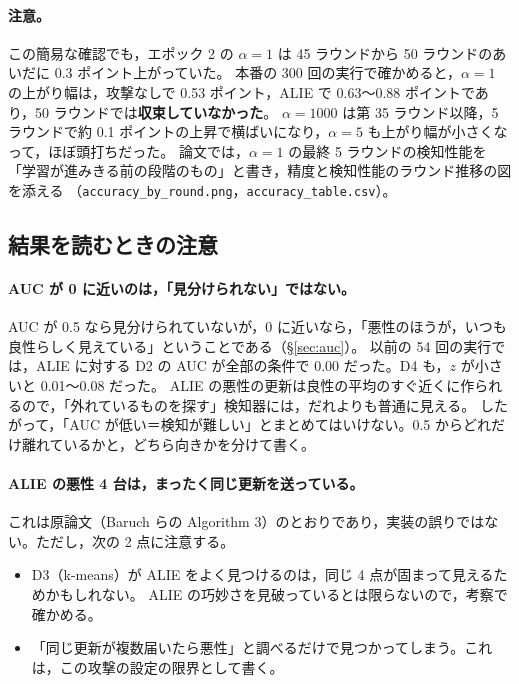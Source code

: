 \documentclass[a4j, dvipdfmx]{jsarticle}  %
\begin{document}
\paragraph{注意。}
この簡易な確認でも，エポック 2 の $\alpha = 1$ は 45 ラウンドから 50 ラウンドのあいだに 0.3 ポイント上がっていた。
本番の 300 回の実行で確かめると，$\alpha = 1$ の上がり幅は，攻撃なしで 0.53 ポイント，ALIE で 0.63〜0.88 ポイントであり，50 ラウンドでは\textbf{収束していなかった}。
$\alpha = 1000$ は第 35 ラウンド以降，5 ラウンドで約 0.1 ポイントの上昇で横ばいになり，$\alpha = 5$ も上がり幅が小さくなって，ほぼ頭打ちだった。
論文では，$\alpha = 1$ の最終 5 ラウンドの検知性能を「学習が進みきる前の段階のもの」と書き，精度と検知性能のラウンド推移の図を添える
（\texttt{accuracy\_by\_round.png}，\texttt{accuracy\_table.csv}）。

\subsection{結果を読むときの注意}

\paragraph{AUC が 0 に近いのは，「見分けられない」ではない。}
AUC が 0.5 なら見分けられていないが，0 に近いなら，「悪性のほうが，いつも良性らしく見えている」ということである（\S\ref{sec:auc}）。
以前の 54 回の実行では，ALIE に対する D2 の AUC が全部の条件で 0.00 だった。D4 も，$z$ が小さいと 0.01〜0.08 だった。
ALIE の悪性の更新は良性の平均のすぐ近くに作られるので，「外れているものを探す」検知器には，だれよりも普通に見える。
したがって，「AUC が低い＝検知が難しい」とまとめてはいけない。0.5 からどれだけ離れているかと，どちら向きかを分けて書く。

\paragraph{ALIE の悪性 4 台は，まったく同じ更新を送っている。}
これは原論文（Baruch らの Algorithm 3）のとおりであり，実装の誤りではない。ただし，次の 2 点に注意する。
\begin{itemize}
  \item D3（k-means）が ALIE をよく見つけるのは，同じ 4 点が固まって見えるためかもしれない。
        ALIE の巧妙さを見破っているとは限らないので，考察で確かめる。
  \item 「同じ更新が複数届いたら悪性」と調べるだけで見つかってしまう。これは，この攻撃の設定の限界として書く。
\end{itemize}
\end{document}
